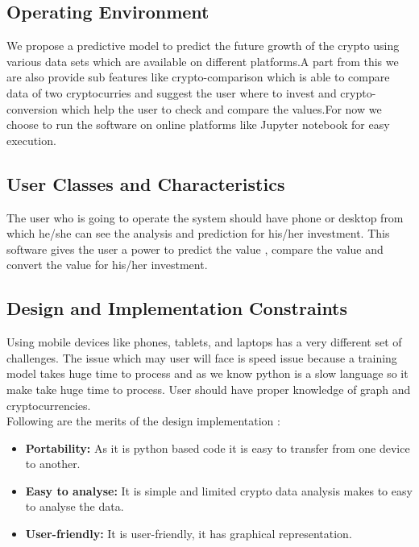 \documentclass[openany,12pt]{report}
\begin{document}
\subsection{Operating Environment}
We propose a predictive model to predict the future growth of the crypto using various data sets which are available on different platforms.A part from this we are also provide sub features like crypto-comparison which is able to compare data of two cryptocurries and suggest the user where to invest and crypto-conversion which help the user to check and compare the values.For now we choose to run the software on online platforms like Jupyter notebook for easy execution.

\subsection{User Classes and Characteristics}
The user who is going to operate the system should have phone or desktop from which he/she can see the analysis and prediction for his/her investment.
This software gives the user a power to predict the value , compare the value and convert the value for his/her investment.

\subsection{Design and Implementation Constraints}
Using mobile devices like phones, tablets, and laptops has a very different set of challenges. The issue which may user will face is speed issue because a training model takes huge time to process and as we know python is a slow language so it make take huge time to process.
User should have proper knowledge of graph and cryptocurrencies.
\\
Following are the merits of the design implementation :
\begin{itemize}
\item{\textbf{Portability:}  As it is python based code it is easy to transfer from one device to another.}
\item{\textbf{Easy to analyse:} It is simple and limited crypto data analysis makes to easy to analyse the data.  }

\item{\textbf{User-friendly:}  It is user-friendly, it has graphical representation.}
\end{itemize}
\end{document}
